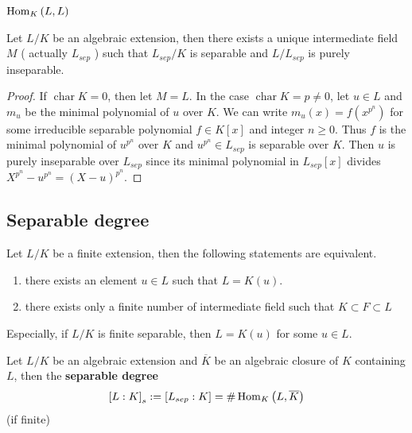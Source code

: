 $\operatorname{\operatorname{Hom}}_{K}\left( L,L \right)$


\begin{theorem}
    \label{thm:decompositon of algebraic extension}
    Let $L/K$ be an algebraic extension, then there exists a unique intermediate field $M$ ( actually $L_{sep}$ ) such that $L_{sep}/K$ is separable and $L/L_{sep}$ is purely inseparable.
    \begin{proof}
        If $\operatorname{char} K = 0$, then let $M=L$.
        In the case $\operatorname{char} K = p \neq 0$, let $u \in L$ and $m_u$ be the minimal polynomial of $u$ over $K$.
        We can write $m_u(x)=f\left(x^{p^n}\right)$ for some  irreducible separable polynomial $f \in K[x]$ and integer $n \geq 0$. Thus $f$ is the minimal polynomial of $u^{p^n}$ over $K$ and $u^{p^n}\in L_{sep}$ is separable over $K$.
        Then $u$ is purely inseparable over $L_{sep}$ since its minimal polynomial in $L_{sep}[x]$ divides $X^{p^n}-u^{p^n}=(X-u)^{p^n}$.
    \end{proof}
\end{theorem}

\subsection{Separable degree}


\begin{theorem}
    Let $L/K$ be a finite extension, then the following statements are equivalent.
    \begin{enumerate}
        \item
              there exists an element $u \in L$ such that $L=K(u)$.
        \item
              there exists only a finite number of intermediate field such that $K\subset F \subset L$
    \end{enumerate}
    Especially, if $L/K$ is finite separable, then $L=K(u)$ for some $u \in L$.
\end{theorem}

\begin{corollary}
    Let $L/K$ be an algebraic extension and $\overline{K}$ be an algebraic closure of $K$ containing $L$, then the \textbf{separable degree}
    \begin{equation*}
        \left[L:K\right]_s
        :=
        \left[L_{sep}:K\right]
        =
        \#\operatorname{\operatorname{Hom}}_{K}\left(L, \overline{K}\right)
    \end{equation*}
    (if finite)
\end{corollary}

